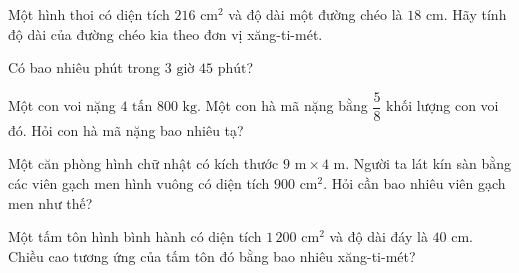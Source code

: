 \begin{ex} %
Một hình thoi có diện tích $216\text{ cm}^2$ và độ dài một đường chéo là $18\text{ cm}$. Hãy tính độ dài của đường chéo kia theo đơn vị xăng-ti-mét.
\end{ex}

\begin{ex} %
Có bao nhiêu phút trong $3\text{ giờ } 45\text{ phút}$?
\end{ex}

\begin{ex} %
Một con voi nặng $4\text{ tấn } 800\text{ kg}$. Một con hà mã nặng bằng $\dfrac{5}{8}$ khối lượng con voi đó. Hỏi con hà mã nặng bao nhiêu tạ?
\end{ex}

\begin{ex} %
Một căn phòng hình chữ nhật có kích thước $9\text{ m} \times 4\text{ m}$. Người ta lát kín sàn bằng các viên gạch men hình vuông có diện tích $900\text{ cm}^2$. Hỏi cần bao nhiêu viên gạch men như thế?
\end{ex}

\begin{ex} %
Một tấm tôn hình bình hành có diện tích $1\,200\text{ cm}^2$ và độ dài đáy là $40\text{ cm}$. Chiều cao tương ứng của tấm tôn đó bằng bao nhiêu xăng-ti-mét?
\end{ex}
